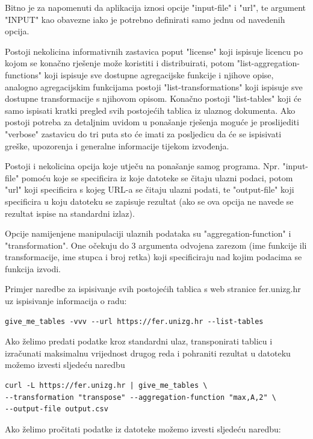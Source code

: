 \documentclass[times, utf8, zavrsni]{fer}
\begin{document}
Bitno je za napomenuti da aplikacija iznosi opcije "input-file" i "url", te
argument "INPUT" kao obavezne iako je potrebno definirati samo jednu od
navedenih opcija.

Postoji nekolicina informativnih zastavica poput "license" koji ispisuje
licencu po kojom se konačno rješenje može koristiti i distribuirati, potom
"list-aggregation-functions" koji
ispisuje sve dostupne agregacijske funkcije i njihove opise, analogno
agregacijskim funkcijama postoji "list-transformations" koji ispisuje sve
dostupne transformacije s njihovom opisom. Konačno postoji "list-tables"
koji će samo ispisati kratki pregled svih postojećih tablica iz ulaznog
dokumenta. Ako postoji potreba za detaljnim uvidom u ponašanje rješenja moguće
je proslijediti "verbose" zastavicu do tri puta sto će imati za posljedicu da
će se ispisivati greške, upozorenja i generalne informacije tijekom izvođenja.

Postoji i nekolicina opcija koje utječu na ponašanje samog programa. Npr.
"input-file" pomoću koje se specificira iz koje datoteke se čitaju ulazni
podaci, potom "url" koji specificira s kojeg URL-a se čitaju ulazni podati, te
"output-file" koji specificira u koju datoteku se zapisuje rezultat (ako se ova
opcija ne navede se rezultat ispise na standardni izlaz).

Opcije namijenjene manipulaciji ulaznih podataka su "aggregation-function" i
"transformation". One očekuju do 3 argumenta odvojena zarezom (ime funkcije ili
transformacije, ime stupca i broj retka) koji specificiraju nad kojim podacima
se funkcija izvodi.

Primjer naredbe za ispisivanje svih postojećih tablica s web stranice
fer.unizg.hr uz ispisivanje informacija o radu:

\begin{lstlisting}
give_me_tables -vvv --url https://fer.unizg.hr --list-tables
\end{lstlisting}

Ako želimo predati podatke kroz standardni ulaz, transponirati tablicu i
izračunati maksimalnu vrijednost drugog reda i pohraniti rezultat u datoteku
možemo izvesti sljedeću naredbu

\begin{lstlisting}
curl -L https://fer.unizg.hr | give_me_tables \
--transformation "transpose" --aggregation-function "max,A,2" \
--output-file output.csv
\end{lstlisting}

Ako želimo pročitati podatke iz datoteke možemo izvesti sljedeću naredbu:
\end{document}
